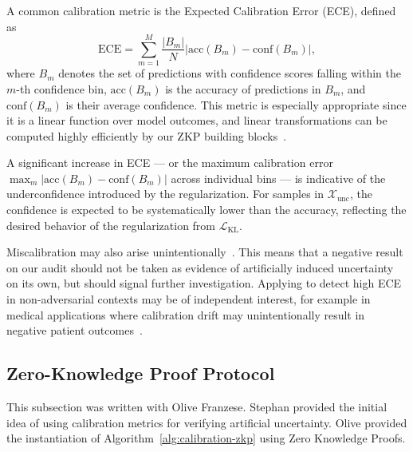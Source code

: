 A common calibration metric is the Expected Calibration Error (ECE), defined as
\begin{equation}
    \text{ECE} = \sum_{m=1}^M \frac{|B_m|}{N} \left| \text{acc}(B_m) - \text{conf}(B_m) \right|,
\end{equation}
where \(B_m\) denotes the set of predictions with confidence scores falling within the \(m\)-th confidence bin, \(\text{acc}(B_m)\) is the accuracy of predictions in \(B_m\), and \(\text{conf}(B_m)\) is their average confidence. This metric is especially appropriate since it is a linear function over model outcomes, and linear transformations can be computed highly efficiently by our ZKP building blocks~\cite{weng2021wolverine}.

A significant increase in ECE --- or the maximum calibration error $\max_{m}\left| \text{acc}(B_m) - \text{conf}(B_m) \right|$ across individual bins --- is indicative of the underconfidence introduced by the regularization. For samples in \(\mathcal{X}_\text{unc}\), the confidence is expected to be systematically lower than the accuracy, reflecting the desired behavior of the regularization from \(\mathcal{L}_\text{KL}\).

Miscalibration may also arise unintentionally~\cite{niculescu2005predicting}. This means that a negative result on our audit should not be taken as evidence of artificially induced uncertainty on its own, but should signal further investigation. Applying \name to detect high ECE in non-adversarial contexts may be of independent interest, for example in medical applications where calibration drift may unintentionally result in negative patient outcomes~\cite{kore2024drift}.




\subsection{Zero-Knowledge Proof Protocol}

\begin{contriback}
This subsection was written with Olive Franzese. Stephan provided the initial idea of using calibration metrics for verifying artificial uncertainty. Olive provided the instantiation of Algorithm~\ref{alg:calibration-zkp} using Zero Knowledge Proofs.
\end{contriback}

